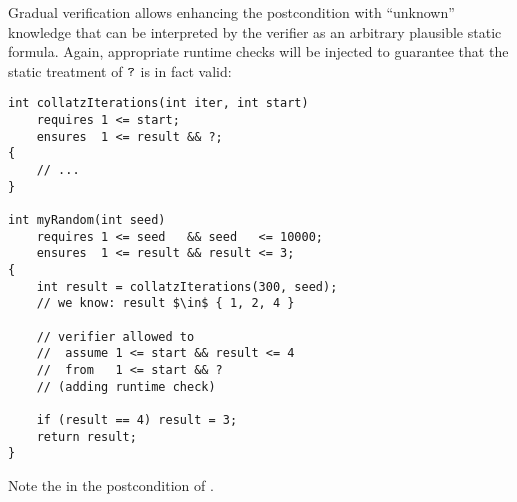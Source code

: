 Gradual verification allows enhancing the postcondition with “unknown” knowledge that can be interpreted by the verifier as an arbitrary plausible static formula.
Again, appropriate runtime checks will be injected to guarantee that the static treatment of $\textup{\texttt{?}}$ is in fact valid:
\begin{lstlisting}
int collatzIterations(int iter, int start)
    requires 1 <= start;
    ensures  1 <= result && ?;
{
    // ...
}

int myRandom(int seed)
    requires 1 <= seed   && seed   <= 10000;
    ensures  1 <= result && result <= 3;
{
    int result = collatzIterations(300, seed);
    // we know: result $\in$ { 1, 2, 4 }
    
    // verifier allowed to
    //  assume 1 <= start && result <= 4
    //  from   1 <= start && ?
    // (adding runtime check)
    
    if (result == 4) result = 3;
    return result;
}
\end{lstlisting}
Note the  in the postcondition of .



% 



